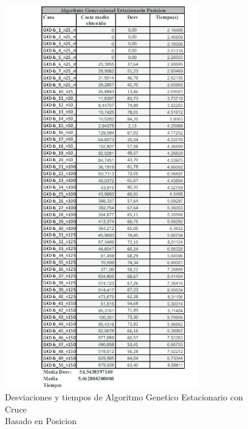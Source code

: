 \documentclass{article}
\begin{document}
\begin{figure}[h]
  \centering
  \includegraphics[width=0.75\textwidth]{capturastablas/AGE-Posicion.png}
  \caption{Desviaciones y tiempos de Algoritmo Genetico Estacionario con Cruce \\
  Basado en Posicion}
\end{figure}
\end{document}
